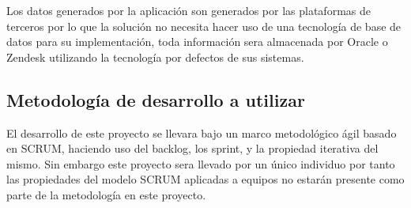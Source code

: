     Los datos generados por la aplicación son generados por las plataformas de terceros por lo que la solución no necesita hacer uso de una tecnología de base de datos para su implementación, toda información sera almacenada por Oracle o Zendesk utilizando la tecnología por defectos de sus sistemas.
    
    \subsection{Metodología de desarrollo a utilizar}
    
    El desarrollo de este proyecto se llevara bajo un marco metodológico ágil basado en SCRUM, haciendo uso del backlog, los sprint, y la propiedad iterativa del mismo. Sin embargo este proyecto sera llevado por un único individuo por tanto las propiedades del modelo SCRUM aplicadas a equipos no estarán presente como parte de la metodología en este proyecto. 
    
    

